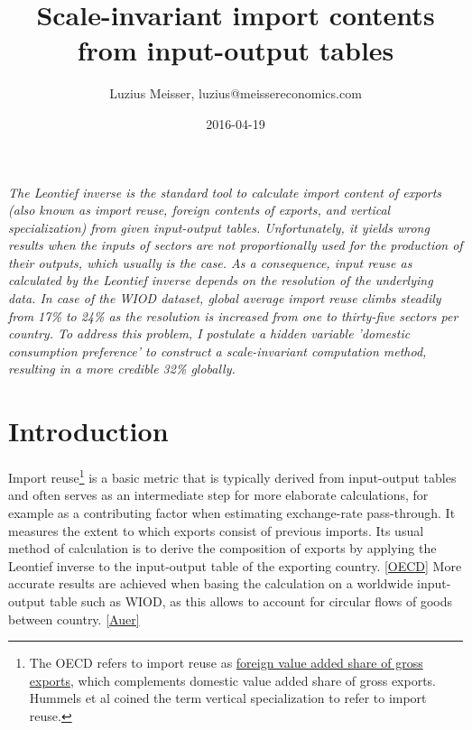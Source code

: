 \documentclass{paper}
\begin{document}
\title{Scale-invariant import contents from input-output tables}


\author{Luzius Meisser, luzius@meissereconomics.com}

\date{2016-04-19}

\maketitle

\emph{The Leontief inverse is the standard tool to calculate import content of exports (also known as import reuse, foreign contents of exports, and vertical specialization) from given input-output tables. Unfortunately, it yields wrong results when the inputs of sectors are not proportionally used for the production of their outputs, which usually is the case. As a consequence, input reuse as calculated by the Leontief inverse depends on the resolution of the underlying data. In case of the WIOD dataset, global average import reuse climbs steadily from 17\% to 24\% as the resolution is increased from one to thirty-five sectors per country. To address this problem, I postulate a hidden variable 'domestic consumption preference' to construct a scale-invariant computation method, resulting in a more credible 32\% globally.}

\section{Introduction}
Import reuse\footnote{The OECD refers to import reuse as \href{http://www.oecd-ilibrary.org/trade/data/oecd-wto-statistics-on-trade-in-value-added_data-00648-en}{foreign value added share of gross exports}, which complements domestic value added share of gross exports. Hummels et al coined the term vertical specialization to refer to import reuse.\cite{hummels2001nature}} is a basic metric that is typically derived from input-output tables and often serves as an intermediate step for more elaborate calculations, for example as a contributing factor when estimating exchange-rate pass-through. It measures the extent to which exports consist of previous imports. Its usual method of calculation is to derive the composition of exports by applying the Leontief inverse to the input-output table of the exporting country. \ref{OECD} More accurate results are achieved when basing the calculation on a worldwide input-output table such as WIOD, as this allows to account for circular flows of goods between country. \ref{Auer}
\end{document}
